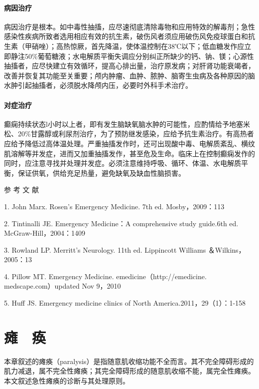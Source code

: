 \subsubsection{病因治疗}

病因治疗是根本。如中毒性抽搐，应尽速彻底清除毒物和应用特效的解毒剂；急性感染性疾病所致者选用相应有效的抗生素，破伤风者须应用破伤风免疫球蛋白和抗生素（甲硝唑）；高热惊厥，首先降温，使体温控制在38℃以下；低血糖发作应立即静注50\%葡萄糖液；水电解质平衡失调应分别纠正所缺少的钙、钠、镁；心源性抽搐者，应尽快建立有效循环，提高心排出量，治疗原发病；对肝肾功能衰竭者，改善并恢复其功能至关重要；颅内肿瘤、血肿、脓肿、脑寄生虫病及各种原因的脑水肿引起抽搐者，必须脱水降颅内压，必要时外科手术治疗。

\subsubsection{对症治疗}

癫痫持续状态l小时以上者，即有发生脑缺氧脑水肿的可能性，应酌情给予地塞米松、20\%甘露醇或利尿剂治疗，为了预防继发感染，应给予抗生素治疗。有高热者应给予降低过高体温处理。严重抽搐发作时，还可出现酸中毒、电解质紊乱、横纹肌溶解等并发症，进而又加重抽搐发作，甚至危及生命。临床上在控制癫痫发作的同时，应注意寻找并处理并发症。必须注意维持呼吸、循环、体温、水电解质平衡，保证供氧，供给充足热量，避免缺氧及缺血性脑损害。


\hypertarget{text00017.htmlux5cux23CHP1-5-4}{}
参 考 文 献

1. John Marx. Rosen's Emergency Medicine. 7th ed. Mosby，2009：113

2. Tintinalli JE. Emergency Medicine：A comprehensive study guide.6th
ed. McGraw-Hill，2004：1409

3. Rowland LP. Merritt's Neurology. 11th ed. Lippincott Williams
＆Wilkins，2005：13

4. Pillow MT. Emergency Medicine. emedicine（http://emedicine.
medscape.com）updated Nov 9，2010

5. Huff JS. Emergency medicine clinics of North
America.2011，29（1）：1-158

\protect\hypertarget{text00018.html}{}{}

\chapter{瘫　痪}

本章叙述的瘫痪（paralysis）是指随意肌收缩功能不全而言。其不完全障碍形成的肌力减退，属不完全性瘫痪；其完全障碍形成的随意肌收缩不能，属完全性瘫痪。本文叙述急性瘫痪的诊断与其处理原则。

